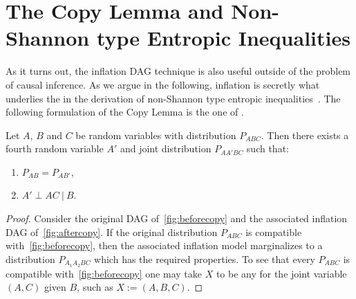 \section{The Copy Lemma and Non-Shannon type Entropic Inequalities}\label{sec:NonShannon}

As it turns out, the inflation DAG technique is also useful outside of the problem of causal inference. As we argue in the following, inflation is secretly what underlies the  in the derivation of non-Shannon type entropic inequalities~\cite[Chapter~15]{yeung_network_2008}. The following formulation of the Copy Lemma is the one of \citet{kaced_equivalence_2013}.

\begin{lemma}
	Let $A$, $B$ and $C$ be random variables with distribution $P_{ABC}$. Then there exists a fourth random variable $A'$ and joint distribution $P_{AA'BC}$ such that:
	\begin{enumerate}
		\item $P_{AB} = P_{AB'}$,
		\item $A' \perp AC \:|\: B$.
	\label{copylemma}
	\end{enumerate}
\end{lemma}



\begin{proof}
	Consider the original DAG of~\cref{fig:beforecopy} and the associated inflation DAG of~\cref{fig:aftercopy}. If the original distribution $P_{ABC}$ is compatible with~\cref{fig:beforecopy}, then the associated inflation model marginalizes to a distribution $P_{A_1 A_2 B C}$ which has the required properties. To see that every $P_{ABC}$ is compatible with~\cref{fig:beforecopy} one may take $X$ to be any  for the joint variable $(A,C)$ given $B$, such as $X := (A,B,C)$.
\end{proof}

